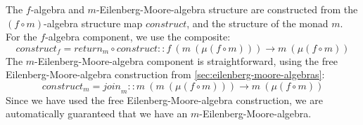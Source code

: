 \documentclass{jfp1}
\begin{document}
\begin{proof*}
  The $f$-algebra and $m$-Eilenberg-Moore-algebra structure are
  constructed from the $(f \circ m)$-algebra structure map
  $\mathit{construct}$, and the structure of the monad $m$.  For the
  $f$-algebra component, we use the composite:
  \begin{displaymath}
    \mathit{construct}_f = \mathit{return}_m \circ \mathit{construct} :: f~(m~(\mu(f \circ m))) \to m~(\mu(f \circ m))
  \end{displaymath}
  The $m$-Eilenberg-Moore-algebra component is straightforward, using
  the free Eilenberg-Moore-algebra construction from
  \autoref{sec:eilenberg-moore-algebras}:
  \begin{displaymath}
    \mathit{construct}_m = \mathit{join}_m :: m~(m~(\mu(f \circ m))) \to m~(\mu(f \circ m))
  \end{displaymath}
  Since we have used the free Eilenberg-Moore-algebra construction, we
  are automatically guaranteed that we have an
  $m$-Eilenberg-Moore-algebra.


\end{proof*}
\end{document}
